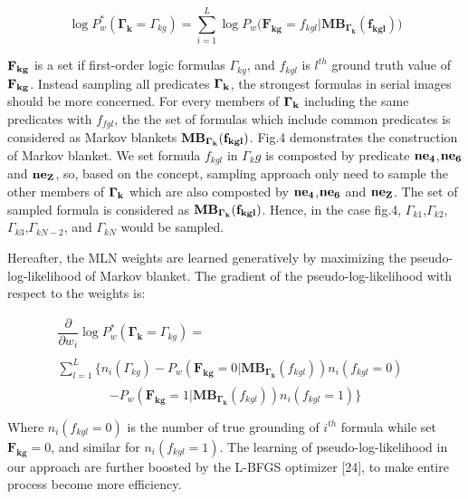 \documentclass[journal]{IEEEtran}
\begin{document}
\begin{equation}
\log P^*_w(\mathbf{\Gamma_k}=\Gamma_{kg})=\sum_{i=1}^L\log P_w(\mathbf{F_{kg}}=f_{kgl}|\mathbf{MB_{\Gamma_k}(f_{kgl}))}
\end{equation}


$\bf{F_{kg}}$ is a set if first-order logic formulas $\Gamma_{kg}$, and $f_{kgl}$ is $l^{th}$ ground truth value of $\bf{F_{kg}}$. Instead sampling all predicates $\bf{\Gamma_{k}}$, the strongest formulas in serial images should be more concerned.  For every members of $\bf{\Gamma_k}$ including the same predicates with $f_{fgl}$, the the set of formulas which include common predicates is considered as Markov blankets $\bf{MB_{\Gamma_k}(f_{kgl}})$. Fig.4 demonstrates the construction of Markov blanket. We set formula $f_{kgl}$ in $\Gamma_kg$ is composted by predicate $\bf{ne_4}$,$\bf{ne_6}$ and $\bf{ne_Z}$, so, based on the concept, sampling approach only need to sample the other members of $\bf{\Gamma_k}$ which are also composted by $\bf{ne_4}$,$\bf{ne_6}$ and $\bf{ne_Z}$. The set of sampled formula is considered as $\bf{MB_{\Gamma_k}(f_{kgl}})$. Hence, in the case fig.4, $\Gamma_{k1}$,$\Gamma_{k2}$, $\Gamma_{k3}$,$\Gamma_{kN-2}$, and $\Gamma_{kN}$ would be sampled.  

Hereafter, the MLN weights are learned generatively by maximizing the pseudo-log-likelihood of Markov blanket. The gradient of the pseudo-log-likelihood with respect to the weights is:

\begin{displaymath}
\begin{array}{ll}
\dfrac{\partial}{\partial w_i}\log P^*_w(\mathbf{\Gamma_k}=\Gamma_{kg})= &\\\\
\sum^L_{l=1}\{n_i(\Gamma_{kg})-P_w(\mathbf{F_{kg}}=0|\mathbf{MB_{\Gamma_k}}(f_{kgl}))n_i(f_{kgl}=0) &\\
\end{array}
\end{displaymath}
\begin{equation}
-P_w(\mathbf{F_{kg}}=1|\mathbf{MB_{\Gamma_k}}(f_{kgl}))n_i(f_{kgl}=1)\}
\end{equation}

Where $n_i(f_{kgl}=0)$ is the number of true grounding of $i^{th}$ formula while set $\mathbf{F_{kg}}=0$, and similar for $n_i(f_{kgl}=1)$. The learning of pseudo-log-likelihood in our approach are further boosted by the L-BFGS optimizer [24], to make entire process become more efficiency.
\end{document}
